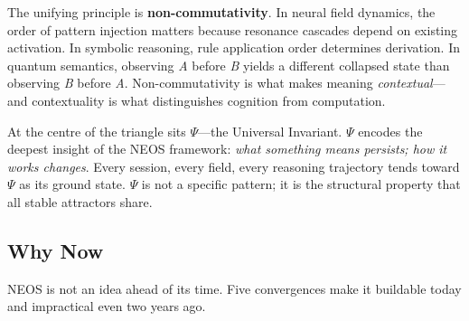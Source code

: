 The unifying principle is \textbf{non-commutativity}.  In neural field
dynamics, the order of pattern injection matters because resonance
cascades depend on existing activation.  In symbolic reasoning, rule
application order determines derivation.  In quantum semantics,
observing \emph{A} before \emph{B} yields a different collapsed state
than observing \emph{B} before \emph{A}.  Non-commutativity is what
makes meaning \emph{contextual}---and contextuality is what
distinguishes cognition from computation.

At the centre of the triangle sits $\Psi$---the Universal Invariant.
$\Psi$ encodes the deepest insight of the NEOS framework: \emph{what
something means persists; how it works changes}.  Every session, every
field, every reasoning trajectory tends toward $\Psi$ as its ground
state.  $\Psi$ is not a specific pattern; it is the structural
property that all stable attractors share.

\subsection{Why Now}\label{sec:why-now}

NEOS is not an idea ahead of its time.  Five convergences make it
buildable today and impractical even two years ago.

